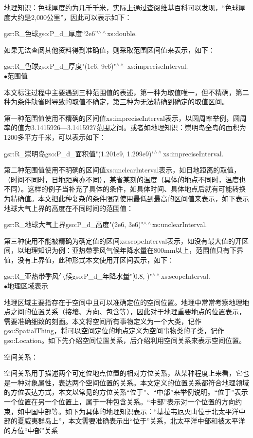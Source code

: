 地理知识：色球厚度约为几千千米，实际上通过查阅维基百科可以发现，“色球厚度大约是2,000公里”，因此可以表示如下：

gsr:R\_色球\quad gso:P\_d\_厚度\quad “2e6”$^{\land\land}$xs:double\quad .

如果无法查阅其他资料得到准确值，则采取范围区间值来表示，如下：

gsr:R\_色球\quad gso:P\_d\_厚度\quad "(1e6, 9e6)"$^{\land\land}$ xs:impreciseInterval\quad .
\\

$\bullet$范围值

本文标注过程中主要遇到三种范围值的表述，第一种为取值唯一，但不精确，第二种为条件缺省时导致的取值不确定，第三种为无法精确到确定的取值区间。

第一种范围值使用不精确的区间值xs:impreciseInterval表示，以圆周率举例，圆周率的值为3.1415926—3.1415927范围之间。或者如地理知识：崇明岛全岛的面积为1200多平方千米，可以表示如下：

gsr:R\_崇明岛\quad gso:P\_d\_面积值\quad "(1.201e9, 1.299e9)"$^{\land\land}$xs:impreciseInterval\quad .

第二种范围值使用不明确的区间值xs:unclearInterval表示，如日地距离的取值，（时间不同时，日地距离亦不同），某省某刻的温度（具体的地点不同时，温度也不同）。这样的例子当补充了具体的条件，如具体时间、具体地点后就有可能转换为精确值。本文把此种复杂的条件限制使用最低到最高的区间值来表示，如下表示地球大气上界的高度在不同时间的范围值：

gsr:R\_地球大气上界\quad gso:P\_d\_高度\quad "(2e6,  3e6)"$^{\land\land}$xs:unclearInterval\quad .

第三种使用不能被精确为确定值的区间xs:scopeInterval表示，如没有最大值的开区间，以地理知识为例：亚热带季风气候年降水量在800mm以上，范围值只有下界值，没有上界值，此种形式本文使用开区间表示，如下：


gsr:R\_亚热带季风气候\quad gso:P\_d\_年降水量\quad "[0.8, )"$^{\land\land}$xs:scopeInterval\quad .
\\

$\bullet$地理区域表示

地理区域主要指存在于空间中且可以准确定位的空间位置。地理中常常考察地理地点之间的位置关系（接壤、方向、包含等），因此对于地理重要地点的位置表示，需要准确细致的刻画。本文将空间所有事物定义为一个大类，记作gso:SpatialThing，将可以空间定位的地点定义为空间事物类的子类，记作gso:Location。如下先介绍空间位置关系，后介绍利用空间关系来表示空间位置。

空间关系：

空间关系用于描述两个可定位地点位置的相对方位关系，从某种程度上来看，它也是一种对象属性，表达两个空间位置的关系。本文定义的位置关系都符合地理领域的方位表达方式，本文以常见的方位关系“位于”、“中部”来举例说明。“位于”表示一个位置在另一个位置上，属于一种包含关系。“中部”表示对一个位置的方向约束，如中国中部等。如下为具体的地理知识表示：“基拉韦厄火山位于北太平洋中部的夏威夷群岛上”，本文需要准确表示出“位于”关系，北太平洋中部和被太平洋的方位“中部”关系

